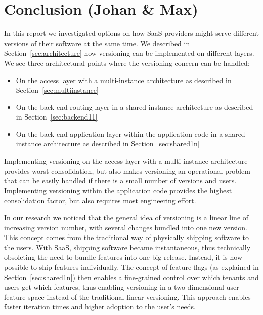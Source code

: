 
\section{Conclusion (Johan \& Max)}
\label{sec:conclusion}


In this report we investigated options on how SaaS providers might serve different versions of their software at the same time. We described in Section~\ref{sec:architecture} how versioning can be implemented on different layers. We see three architectural points where the versioning concern can be handled:

\begin{itemize}
  \item On the access layer with a multi-instance architecture as described in Section~\ref{sec:multiinstance}
  \item On the back end routing layer in a shared-instance architecture as described in Section~\ref{sec:backend11}
  \item On the back end application layer within the application code in a shared-instance architecture as described in Section~\ref{sec:shared1n}
\end{itemize}

Implementing versioning on the access layer with a multi-instance architecture provides worst consolidation, but also makes versioning an operational problem that can be easily handled if there is a small number of versions and users. Implementing versioning within the application code provides the highest consolidation factor, but also requires most engineering effort.

In our research we noticed that the general idea of versioning is a linear line of increasing version number, with several changes bundled into one new version. This concept comes from the traditional way of physically shipping software to the users. With SaaS, shipping software became instantaneous, thus technically obsoleting the need to bundle features into one big release. Instead, it is now possible to ship features individually. The concept of feature flags (as explained in Section~\ref{sec:shared1n}) then enables a fine-grained control over which tenants and users get which features, thus enabling versioning in a two-dimensional user-feature space instead of the traditional linear versioning. This approach enables faster iteration times and higher adoption to the user's needs.

